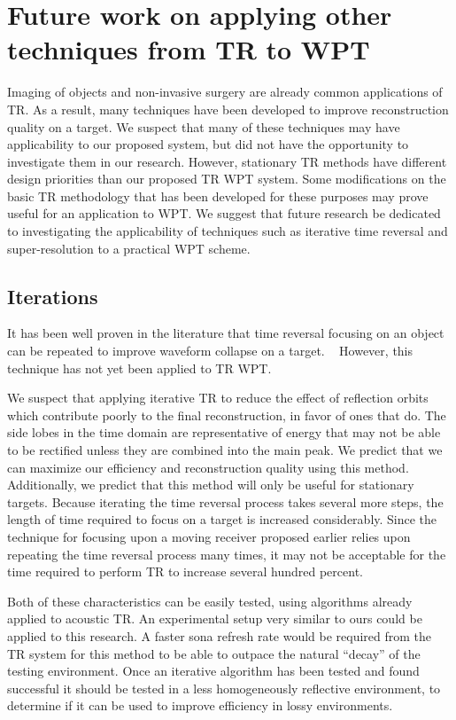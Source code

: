 \section{Future work on applying other techniques from TR to WPT}
\label{sec:future-tr}
Imaging of objects and non-invasive surgery are already common applications of TR.
As a result, many techniques have been developed to improve reconstruction quality on a target.
We suspect that many of these techniques may have applicability to our proposed system, but did not
have the opportunity to investigate them in our research.
However, stationary TR methods have different design priorities than our proposed TR WPT system.
Some modifications on the basic TR methodology that has been developed for these purposes may prove useful for an application to WPT. We suggest that future research be dedicated to investigating the applicability of techniques such as iterative time reversal and super-resolution to a practical WPT scheme.

\subsection{Iterations}

It has been well proven in the literature that time reversal focusing on an object can be repeated to improve waveform collapse on a target. ~\cite{prada_iterative_1991} However, this technique has not yet been applied to TR WPT.

We suspect that applying iterative TR to reduce the effect of reflection orbits which contribute poorly to the final reconstruction, in favor of ones that do. The side lobes in the time domain are representative of energy that may not be able to be rectified unless they are combined into the main peak. We predict that we can maximize our efficiency and reconstruction quality using this method. Additionally, we predict that this method will only be useful for stationary targets. Because iterating the time reversal process takes several more steps, the length of time required to focus on a target is increased considerably. Since the technique for focusing upon a moving receiver proposed earlier relies upon repeating the time reversal process many times, it may not be acceptable for the time required to perform TR to increase several hundred percent. 

Both of these characteristics can be easily tested, using algorithms already applied to acoustic TR. An experimental setup very similar to ours could be applied to this research. A faster sona refresh rate would be required from the TR system for this method to be able to outpace the natural ``decay'' of the testing environment. Once an iterative algorithm has been tested and found successful it should be tested in a less homogeneously reflective environment, to determine if it can be used to improve efficiency in lossy environments.

